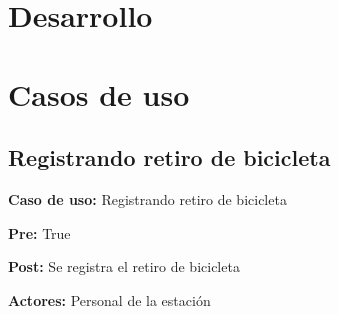 \documentclass[a4paper, 10pt, twoside]{article}
\begin{document}

\vspace{2cm}








\section{Desarrollo}




\section{Casos de uso}

\subsection{Registrando retiro de bicicleta}

\textbf{Caso de uso:} Registrando retiro de bicicleta

\textbf{Pre:} True

\textbf{Post:} Se registra el retiro de bicicleta

\textbf{Actores:} Personal de la estación
\\
\end{document}
